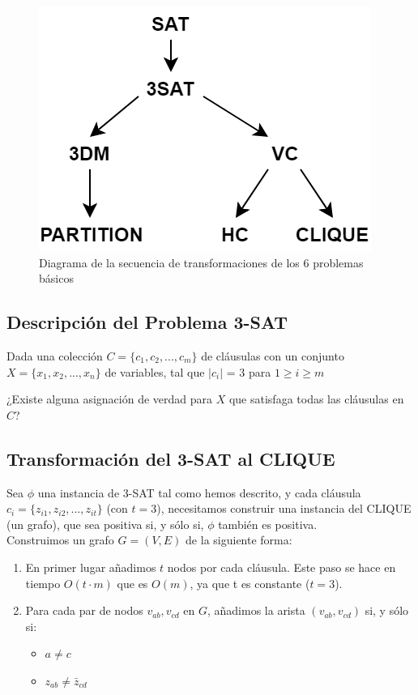\documentclass{article}
\begin{document}
\begin{figure}[h!]
\centering
\includegraphics[width=0.8\linewidth]{img/problem-diagram.png}
\caption{Diagrama de la secuencia de transformaciones de los 6 problemas básicos}
\end{figure}

\subsection{Descripción del Problema 3-SAT}
Dada una colección $C = \{c_{1}, c_{2}, ..., c_{m}\}$ de cláusulas con un conjunto $X = \{x_{1}, x_{2}, ..., x_{n}\}$ de variables, tal que $\vert c_{i} \vert$ = 3 para $1 \geq \textit{i} \geq m$\\

\centerline{¿Existe alguna asignación de verdad para $X$ que satisfaga todas las cláusulas en $C$?}

\subsection{Transformación del 3-SAT al CLIQUE}
 Sea $\phi$ una instancia de 3-SAT tal como hemos descrito, y cada cláusula $c_{i} = \{z_{i1}, z_{i2}, ..., z_{it}\}$ (con $t = 3$), necesitamos construir una instancia del CLIQUE (un grafo), que sea positiva si, y sólo si, $\phi$ también es positiva.\\
 
  Construimos un grafo $G = (V,E)$ de la siguiente forma:
\begin{enumerate}
    \item En primer lugar añadimos $t$ nodos por cada cláusula. Este paso se hace en tiempo $O(t \cdot m)$ que es $O(m)$,  ya que t es constante ($t = 3$).
    \item Para cada par de nodos $v_{ab},v_{cd}$ en $G$, añadimos la arista $(v_{ab},v_{cd})$ si, y sólo si:
    \begin{itemize}
        \item $a \neq c$
        \item $z_{ab} \neq \bar{z}_{cd}$
    \end{itemize}
\end{enumerate}\\
\end{document}

